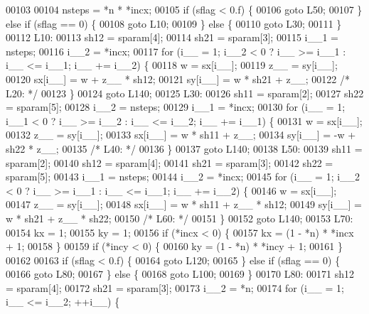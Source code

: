 \begin{DoxyCode}
00103 
00104     nsteps = *n * *incx;
00105     \textcolor{keywordflow}{if} (sflag < 0.f) \{
00106     \textcolor{keywordflow}{goto} L50;
00107     \} \textcolor{keywordflow}{else} \textcolor{keywordflow}{if} (sflag == 0) \{
00108     \textcolor{keywordflow}{goto} L10;
00109     \} \textcolor{keywordflow}{else} \{
00110     \textcolor{keywordflow}{goto} L30;
00111     \}
00112 L10:
00113     sh12 = sparam[4];
00114     sh21 = sparam[3];
00115     i\_\_1 = nsteps;
00116     i\_\_2 = *incx;
00117     \textcolor{keywordflow}{for} (i\_\_ = 1; i\_\_2 < 0 ? i\_\_ >= i\_\_1 : i\_\_ <= i\_\_1; i\_\_ += i\_\_2) \{
00118     w = sx[i\_\_];
00119     z\_\_ = sy[i\_\_];
00120     sx[i\_\_] = w + z\_\_ * sh12;
00121     sy[i\_\_] = w * sh21 + z\_\_;
00122 \textcolor{comment}{/* L20: */}
00123     \}
00124     \textcolor{keywordflow}{goto} L140;
00125 L30:
00126     sh11 = sparam[2];
00127     sh22 = sparam[5];
00128     i\_\_2 = nsteps;
00129     i\_\_1 = *incx;
00130     \textcolor{keywordflow}{for} (i\_\_ = 1; i\_\_1 < 0 ? i\_\_ >= i\_\_2 : i\_\_ <= i\_\_2; i\_\_ += i\_\_1) \{
00131     w = sx[i\_\_];
00132     z\_\_ = sy[i\_\_];
00133     sx[i\_\_] = w * sh11 + z\_\_;
00134     sy[i\_\_] = -w + sh22 * z\_\_;
00135 \textcolor{comment}{/* L40: */}
00136     \}
00137     \textcolor{keywordflow}{goto} L140;
00138 L50:
00139     sh11 = sparam[2];
00140     sh12 = sparam[4];
00141     sh21 = sparam[3];
00142     sh22 = sparam[5];
00143     i\_\_1 = nsteps;
00144     i\_\_2 = *incx;
00145     \textcolor{keywordflow}{for} (i\_\_ = 1; i\_\_2 < 0 ? i\_\_ >= i\_\_1 : i\_\_ <= i\_\_1; i\_\_ += i\_\_2) \{
00146     w = sx[i\_\_];
00147     z\_\_ = sy[i\_\_];
00148     sx[i\_\_] = w * sh11 + z\_\_ * sh12;
00149     sy[i\_\_] = w * sh21 + z\_\_ * sh22;
00150 \textcolor{comment}{/* L60: */}
00151     \}
00152     \textcolor{keywordflow}{goto} L140;
00153 L70:
00154     kx = 1;
00155     ky = 1;
00156     \textcolor{keywordflow}{if} (*incx < 0) \{
00157     kx = (1 - *n) * *incx + 1;
00158     \}
00159     \textcolor{keywordflow}{if} (*incy < 0) \{
00160     ky = (1 - *n) * *incy + 1;
00161     \}
00162 
00163     \textcolor{keywordflow}{if} (sflag < 0.f) \{
00164     \textcolor{keywordflow}{goto} L120;
00165     \} \textcolor{keywordflow}{else} \textcolor{keywordflow}{if} (sflag == 0) \{
00166     \textcolor{keywordflow}{goto} L80;
00167     \} \textcolor{keywordflow}{else} \{
00168     \textcolor{keywordflow}{goto} L100;
00169     \}
00170 L80:
00171     sh12 = sparam[4];
00172     sh21 = sparam[3];
00173     i\_\_2 = *n;
00174     \textcolor{keywordflow}{for} (i\_\_ = 1; i\_\_ <= i\_\_2; ++i\_\_) \{

\end{DoxyCode}
